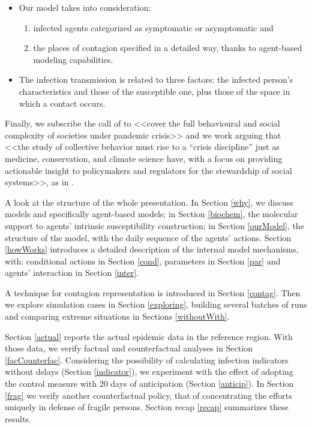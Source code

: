 \documentclass[graybox]{svmult}
\begin{document}
\begin{itemize}

\item

Our model takes into consideration: 

\begin{enumerate}[label=\roman*]
\item infected agents categorized as symptomatic or asymptomatic and 
\item the places of contagion specified in a detailed way, thanks to agent-based modeling capabilities. 
\end{enumerate}

 \item
The infection transmission is related to three factors: the infected person's characteristics and those of the susceptible one, plus those of the space in which a contact occurs.

\end{itemize}


Finally, we subscribe the call of \cite{squazzoni2020} to <<cover the full behavioural and social complexity of societies under pandemic crisis>> and we work arguing that <<the study of collective behavior must rise to a ``crisis discipline'' just as medicine, conservation, and climate science have, with a focus on providing actionable insight to policymakers and regulators for the stewardship of social systems>>, as in \cite{Bak-Colemane2025764118}. 

A look at the structure of the whole presentation.
In Section \ref{why}, we discuss models and specifically agent-based models; in Section \ref{biochem}, the molecular support to agents' intrinsic susceptibility construction; in Section \ref{ourModel}, the structure of the model, with the daily sequence of the agents' actions. Section \ref{howWorks} introduces a detailed description of the internal model mechanisms, with: conditional actions in Section \ref{cond}, parameters in Section \ref{par} and agents' interaction in Section \ref{inter}.

A technique for contagion representation is introduced in Section \ref{contag}. Then we explore simulation cases in Section \ref{exploring}, building several batches of runs and comparing extreme situations in Sections \ref{withoutWith}.

Section \ref{actual} reports the actual epidemic data in the reference region. With those data, we verify factual and counterfactual analyses in Section \ref{facCounterfac}. Considering the possibility of calculating infection indicators without delays (Section \ref{indicator}), we experiment with the effect of adopting the control measure with 20 days of anticipation (Section \ref{anticip}). In Section \ref{frag} we verify another counterfactual policy, that of concentrating the efforts uniquely in defense of fragile persons. Section recap \ref{recap} summarizes these results.
\end{document}
